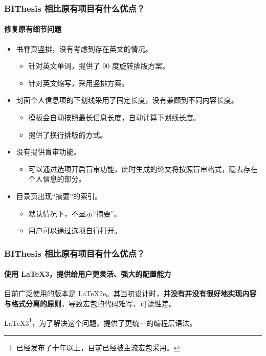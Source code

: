 \documentclass[
  aspectratio=169,
  presentation,
  titlegraphic=./images/bit.png,
  framelogo=./images/bit.png
]{bitbeamer}
\begin{document}
\begin{frame}[t]
  \frametitle{BIThesis 相比原有项目有什么优点？}
  \framesubtitle{修复原有细节问题}

  \begin{itemize}
    \item 书脊页竖排，没有考虑到存在英文的情况。
    \begin{itemize}
      \item 针对英文单词，提供了 90 度旋转排版方案。
      \item 针对英文缩写，采用竖排方案。
    \end{itemize}
    \item 封面个人信息项的下划线采用了固定长度，没有兼顾到不同内容长度。
    \begin{itemize}
      \item 模板会自动按照最长信息长度，自动计算下划线长度。
      \item 提供了换行排版的方式。
    \end{itemize}
    \item 没有提供盲审功能。
    \begin{itemize}
      \item 可以通过选项开启盲审功能，此时生成的论文将按照盲审格式，隐去存在个人信息的部分。
    \end{itemize}
    \item 目录页出现“摘要”的索引。
    \begin{itemize}
      \item 默认情况下，不显示“摘要”。
      \item 用户可以通过选项自行打开。
    \end{itemize}
  \end{itemize}
\end{frame}


\begin{frame}[fragile]
  \frametitle{BIThesis 相比原有项目有什么优点？}
  \framesubtitle{使用 LaTeX3，提供给用户更灵活、强大的配置能力}

  目前广泛使用的版本是 LaTeX2e。其当初设计时，\textbf{并没有并没有很好地实现内容与格式分离的原则}，导致宏包的代码难写、可读性差。
  
  LaTeX3\footnote{已经发布了十年以上，目前已经被主流宏包采用。}，为了解决这个问题，提供了更统一的编程层语法。

\end{frame}
\end{document}
